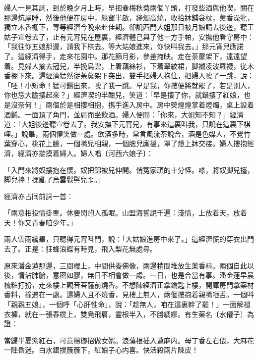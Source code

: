 婦人一見其詞，到於晚夕月上時，早把春梅秋菊兩個丫頭，打發些酒與他喫，關在那邊炕屋睡，然後他便在房中，綠窗半啟，絳燭高燒，收拾牀鋪衾枕，薰香澡牝，獨立木香棚下，專等經濟今晚來赴佳期。卻說西門大姐那日被月娘請去後邊，聽王姑子宣卷去了，止有元宵兒在屋裏，經濟體己與了他一方手帕，安撫他看守房中：「我往你五娘那邊，請我下棋去。等大姑娘進來，你快呌我去。」那元宵兒應諾了。這經濟得手，走來花園中。那花篩月影，參差掩映。走在荼䕷架下，遠遠望着。見婦人摘去冠兒，半挽烏雲，上着藕絲衫，下着翠紋裙，脚襯凌波羅襪，従木香棚下來。這經濟猛然従荼䕷架下突出，雙手把婦人抱住，把婦人唬了一跳，說：「呸！小短命！猛可鑽出來，唬了我一跳。早是我，你摟便將就罷了，若是别人，你也恁大膽摟起來？」經濟喫的半酣兒，笑道：「早是摟了你，就錯摟了紅娘，也是沒奈何！」兩個於是相摟相抱，携手進入房中。房中熒煌煌掌着燈燭，桌上設着酒餚。一面頂了角門，並肩而坐飲酒。婦人便問：「你來，大姐知不知？」經濟道：「大姐後邊聽宣卷去了。我安撫下元宵兒，有事來這裏叫我，只說在這裏下棋哩。」說畢，兩個懽笑做一處。飲酒多時，常言風流茶說合，酒是色媒人，不覺竹葉穿心，桃花上臉，一個嘴兒相親，一個腮兒廝搵，罩了燈上牀交接。婦人摟抱經濟，經濟亦揣摸着婦人。婦人唱〔河西六娘子〕：

\begin{myquote}
「入門來將奴摟抱在懷。奴把錦被兒伸開。俏冤家頑的十分怪。嗏，將奴脚兒擡，脚兒擡！揉亂了烏雲䯼髻兒歪。」
\end{myquote}

經濟亦占囘前詞一首：

\begin{myquote}
「兩意相投情掛牽。休要閃的人孤眠。山盟海誓說千遍：淺情，上放着天，放着天！你又青春咱少年。」
\end{myquote}

兩人雲雨纔畢，只聽得元宵呌門，說：「大姑娘進房中來了。」這經濟慌的穿衣出門去了。正是：狂蜂浪蝶有時見，飛入梨花無處尋。

原來潘金蓮那邊，三間樓上，中間供養佛像，兩邊稍間堆放生薬香料。兩個自此以後，情沾肺腑，意密如膠，無日不相會做一䖏。一日，也是合當有事。潘金蓮早晨梳粧打扮，走來樓上觀音菩薩前燒香。不想陳經濟正拿鑰匙上樓，開庫房門拿薬材香料，撞遇在一處。這婦人且不燒香，見樓上無人，兩個摟抱着親嘴咂舌。一個呌「親親五娘」，一個呼「心肝性命」，說：「趁無人，咱在這裏幹了罷！」一面解褪衣褲，就在一張春櫈上，雙鳧飛肩，靈根半入，不勝綢繆。有生薬名〔水僊子〕為證：

\begin{myquote}
當歸半夏紫紅石，可意檳榔招做女婿。浪蕩根插入蓖麻内。母丁香左右偎，大麻花一陣昏迷。白水銀撲簇簇下，紅娘子心内喜。快活殺兩片陳皮！
\end{myquote}

